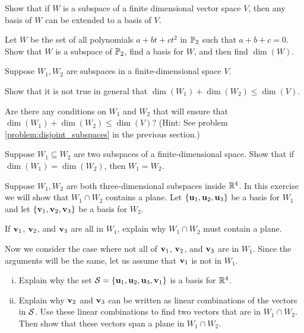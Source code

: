 \item Show that if $W$ is a subspace of a finite dimensional vector space $V$, then any basis of $W$ can be extended to a basis of $V$.

\item Let $W$ be the set of all polynomials $a+bt+ct^2$ in $\mathbb{P}_2$ such that $a+b+c = 0$. Show that $W$ is a subspace of $\mathbb{P}_2$, find a basis for $W$, and then find $\dim(W)$. 

\item Suppose $W_1, W_2$ are subspaces in a finite-dimensional space $V$.
\ba
\item Show that it is not true in general that $\dim(W_1)+\dim(W_2) \leq \dim(V)$.

\item Are there any conditions on $W_1$ and $W_2$ that will ensure that $\dim(W_1)+\dim(W_2) \leq \dim(V)$? (Hint: See problem \ref{problem:disjoint_subspaces} in the previous section.)  

\ea

\item Suppose $W_1 \subseteq W_2$ are two subspaces of a finite-dimensional space. Show that if $\dim(W_1)=\dim(W_2)$, then $W_1=W_2$.

\item Suppose $W_1, W_2$ are both three-dimensional subspaces inside $\mathbb{R}^4$. In this exercise we will show that $W_1\cap W_2$ contains a plane. Let $\{\mathbf{u}_1, \mathbf{u}_2, \mathbf{u}_3\}$ be a basis for $W_1$ and let $\{\mathbf{v}_1, \mathbf{v}_2, \mathbf{v}_3\}$ be a basis for $W_2$.
\ba
\item If $\mathbf{v}_1$, $\mathbf{v}_2$, and $\mathbf{v}_3$ are all in $W_1$, explain why $W_1 \cap W_2$ must contain a plane. 

\item Now we consider the case where not all of $\mathbf{v}_1$, $\mathbf{v}_2$, and $\mathbf{v}_3$ are in $W_1$. Since the arguments will be the same, let us assume that $\mathbf{v}_1$ is not in $W_1$. 

	\begin{enumerate}[i.]
	\item Explain why the set $\mathcal{S} = \{\mathbf{u}_1, \mathbf{u}_2, \mathbf{u}_3, \mathbf{v}_1\}$ is a basis for $\mathbb{R}^4$. 
	
	\item Explain why $\mathbf{v}_2$ and $\mathbf{v}_3$ can be written as linear combinations of the vectors in $\mathcal{S}$. Use these linear combinations to find two vectors that are in $W_1 \cap W_2$. Then show that these vectors span a plane in $W_1 \cap W_2$.
	
	\end{enumerate}
\ea


